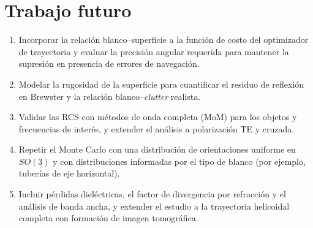 \documentclass[11pt,a4paper]{report}
\begin{document}
\section{Trabajo futuro}

\begin{enumerate}[itemsep=3pt]
  \item Incorporar la relación blanco--superficie a la función de costo del
  optimizador de trayectoria y evaluar la precisión angular requerida para
  mantener la supresión en presencia de errores de navegación.
  \item Modelar la rugosidad de la superficie para cuantificar el residuo de
  reflexión en Brewster y la relación blanco--\emph{clutter} realista.
  \item Validar las RCS con métodos de onda completa (MoM) para los objetos
  y frecuencias de interés, y extender el análisis a polarización TE y
  cruzada.
  \item Repetir el Monte Carlo con una distribución de orientaciones
  uniforme en $SO(3)$ y con distribuciones informadas por el tipo de blanco
  (por ejemplo, tuberías de eje horizontal).
  \item Incluir pérdidas dieléctricas, el factor de divergencia por
  refracción y el análisis de banda ancha, y extender el estudio a la
  trayectoria helicoidal completa con formación de imagen tomográfica.
\end{enumerate}
\end{document}
